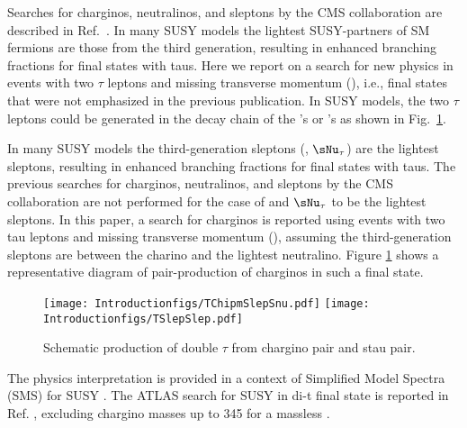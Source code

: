 Searches for charginos, neutralinos, and sleptons by the CMS collaboration are described in Ref.~\cite{Khachatryan:2014qwa,Khachatryan:2014mma,Khachatryan:2015kxa}.
In many SUSY models \cite{Martin:1997ns} the lightest SUSY-partners of SM fermions are those from the third generation,
resulting in enhanced branching fractions for final states with taus.  Here we report on a search for new physics in events
with two $\tau$ leptons and missing transverse momentum (\MPT), i.e., final states that were not emphasized in the previous publication.
In SUSY models, the two $\tau$ leptons could be generated in the decay chain of the \sTau's or \PSGcpDo's as shown in Fig.~\ref{fig:Productions}. 



In many SUSY models \cite{Martin:1997ns} the third-generation sleptons (\sTau, $\sNu_\tau$) are the lightest sleptons, 
resulting in enhanced branching fractions for final states with taus. The previous searches for charginos, neutralinos, 
and sleptons by the CMS collaboration \cite{Khachatryan:2014qwa} are not performed for the case of \stau and $\sNu_\tau$
to be the lightest sleptons. In this paper, a search for charginos is reported using events with two tau leptons and 
missing transverse momentum (\MPT), assuming the third-generation sleptons are between the charino and the lightest neutralino. 
Figure \ref{fig:Productions} shows a representative diagram of pair-production of charginos in such a final state. 
\begin{figure}[!Hhtb]
\centering
\texttt{[image: Introductionfigs/TChipmSlepSnu.pdf]}
\texttt{[image: Introductionfigs/TSlepSlep.pdf]}
\caption{Schematic production of double $\tau$ from chargino pair and stau pair.}
\label{fig:Productions}
\end{figure}
The physics interpretation is provided in a context of Simplified Model Spectra (SMS) for SUSY \cite{Alwall:2008ag,alves:sms}.
The ATLAS search for SUSY in di-t final state is reported in Ref. \cite{Aad:2014yka}, excluding chargino masses up to 345 \GeV 
for a massless \PSGczDo.



